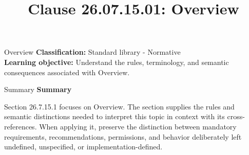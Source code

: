 \documentclass[10pt,letterpaper]{article}
\title{Clause 26.07.15.01: Overview}
\author{}
\date{}
\begin{document}
\maketitle
\begin{CornellOverviewBox}{Overview}
\textbf{Classification:} Standard library - Normative\\[2pt]
\textbf{Learning objective:} Understand the rules, terminology, and semantic consequences associated with Overview.
\end{CornellOverviewBox}\begin{CornellSummaryBox}{Summary}
{\sffamily\bfseries\color{Accent} Summary}\par\vspace{3pt}Section 26.7.15.1 focuses on Overview. The section supplies the rules and semantic distinctions needed to interpret this topic in context with its cross-references. When applying it, preserve the distinction between mandatory requirements, recommendations, permissions, and behavior deliberately left undefined, unspecified, or implementation-defined.
\end{CornellSummaryBox}
\end{document}
